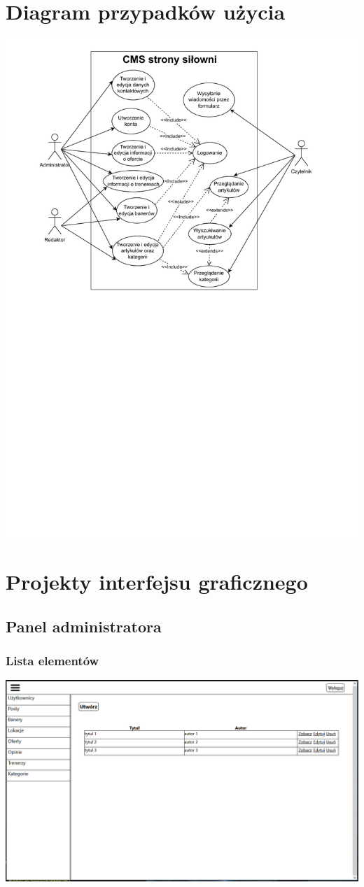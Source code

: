 \documentclass[12pt]{article}
\begin{document}
\section{Diagram przypadków użycia}
\includegraphics[width=1\textwidth, angle=0]{images/Przypadki_uzycia.pdf}
\newpage
\section{Projekty interfejsu graficznego}
\subsection{Panel administratora}
\subsubsection{Lista elementów}
\includegraphics[width=1\textwidth, angle=0]{images/Interfejs_lista.png}
\end{document}
